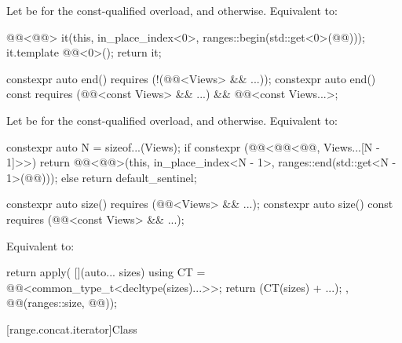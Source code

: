 \begin{itemdescr}
\pnum
\effects
Let  be
 for the const-qualified overload, and
 otherwise.
Equivalent to:
\begin{codeblock}
@@<@@> it(this, in_place_index<0>, ranges::begin(std::get<0>(@@)));
it.template @@<0>();
return it;
\end{codeblock}
\end{itemdescr}

%
\begin{itemdecl}
constexpr auto end() requires (!(@@<Views> && ...));
constexpr auto end() const
  requires (@@<const Views> && ...) && @@<const Views...>;
\end{itemdecl}

\begin{itemdescr}
\pnum
\effects
Let  be
 for the const-qualified overload, and
 otherwise.
Equivalent to:
\begin{codeblock}
constexpr auto N = sizeof...(Views);
if constexpr (@@<@@<@@, Views...[N - 1]>>) {
  return @@<@@>(this, in_place_index<N - 1>,
                            ranges::end(std::get<N - 1>(@@)));
} else {
  return default_sentinel;
}
\end{codeblock}
\end{itemdescr}

%
\begin{itemdecl}
constexpr auto size() requires (@@<Views> && ...);
constexpr auto size() const requires (@@<const Views> && ...);
\end{itemdecl}

\begin{itemdescr}
\pnum
\effects
Equivalent to:
\begin{codeblock}
return apply(
  [](auto... sizes) {
    using CT = @@<common_type_t<decltype(sizes)...>>;
    return (CT(sizes) + ...);
  },
  @@(ranges::size, @@));
\end{codeblock}
\end{itemdescr}

[range.concat.iterator]{Class }

